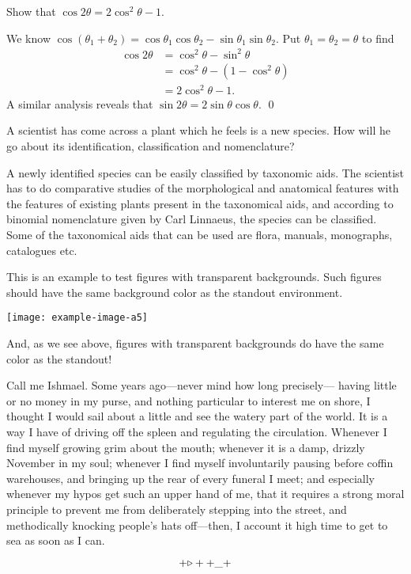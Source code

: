 \documentclass{article}
\begin{document}
\begin{standout}
\begin{example}
  Show that $\cos{2\theta} = 2\cos^{2}{\theta} - 1$.
\end{example}
\begin{solution}
  We know $\cos(\theta_{1} + \theta_{2}) = \cos{\theta_{1}}\cos{\theta_{2}} - \sin{\theta_{1}}\sin{\theta_{2}}$.
  Put $\theta_{1} = \theta_{2} = \theta$ to find
  \begin{equation*}
    \begin{aligned}
      \cos{2\theta} &= \cos^{2}{\theta} - \sin^{2}{\theta}\\
         &= \cos^{2}{\theta} - (1-\cos^{2}\theta)\\
         &= 2\cos^{2}{\theta} - 1.
    \end{aligned}
  \end{equation*}
  A similar analysis reveals that $\sin2\theta = 2\sin{\theta}\cos{\theta}$.
  \qed
\end{solution}
\begin{example}
  A scientist has come across a plant which he feels is a new species. How will he go about its identification, classification and nomenclature?
\end{example}
\begin{solution}
  A newly identified species can be easily classified by taxonomic aids. The scientist has to do comparative studies of the morphological and anatomical features with the features of existing plants present in the taxonomical aids, and according to binomial nomenclature given by Carl Linnaeus, the species can be classified. Some of the taxonomical aids that can be used are flora, manuals, monographs, catalogues etc.
\end{solution}
\begin{example}
  This is an example to test figures with transparent backgrounds.
  Such figures should have the same background color as the standout environment.
  \begin{center}
    \texttt{[image: example-image-a5]}
  \end{center}
  And, as we see above, figures with transparent backgrounds do have the same color as the standout!
\end{example}
\end{standout}

Call me Ishmael.
Some years ago---never mind how long precisely---
having little or no money in my purse, and nothing particular to
interest me on shore, I thought I would sail about a little and see
the watery part of the world.
It is a way I have of driving off the
spleen and regulating the circulation.
Whenever I find myself growing grim about the mouth; whenever it is a damp, drizzly
November in my soul; whenever I find myself involuntarily pausing
before coffin warehouses, and bringing up the rear of every funeral
I meet; and especially whenever my hypos get such an upper hand of me,
that it requires a strong moral principle to prevent me from
deliberately stepping into the street, and methodically knocking
people's hats off---then, I account it high time to get to sea as
soon as I can.

%
\begin{equation}
+\vcenter{\hbox{$\triangleright$}}+
+\_+
\end{equation}
%
\end{document}
